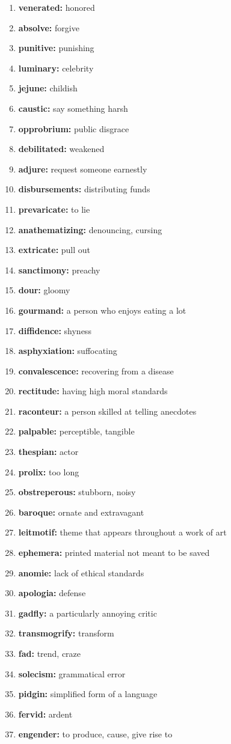 \documentclass{article}
\begin{document}
\begin{enumerate}
    \item \textbf{venerated: }{honored}
    \item \textbf{absolve: }{forgive}
    \item \textbf{punitive: }{punishing}
    \item \textbf{luminary: }{celebrity}
    \item \textbf{jejune: }{childish}
    \item \textbf{caustic: }{say something harsh}
    \item \textbf{opprobrium: }{public disgrace}
    \item \textbf{debilitated: }{weakened}
    \item \textbf{adjure: }{request someone earnestly}
    \item \textbf{disbursements: }{distributing funds}
    \item \textbf{prevaricate: }{to lie}
    \item \textbf{anathematizing: }{denouncing, cursing}
    \item \textbf{extricate: }{pull out}
    \item \textbf{sanctimony: }{preachy}
    \item \textbf{dour: }{gloomy}
    \item \textbf{gourmand: }{a person who enjoys eating a lot}
    \item \textbf{diffidence: }{shyness}
    \item \textbf{asphyxiation: }{suffocating}
    \item \textbf{convalescence: }{recovering from a disease}
    \item \textbf{rectitude: }{having high moral standards}
    \item \textbf{raconteur: }{a person skilled at telling anecdotes}
    \item \textbf{palpable: }{perceptible, tangible}
    \item \textbf{thespian: }{actor}
    \item \textbf{prolix: }{too long}
    \item \textbf{obstreperous: }{stubborn, noisy}
    \item \textbf{baroque: }{ornate and extravagant}
    \item \textbf{leitmotif: }{theme that appears throughout a work of art}
    \item \textbf{ephemera: }{printed material not meant to be saved}
    \item \textbf{anomie: }{lack of ethical standards}
    \item \textbf{apologia: }{defense}
    \item \textbf{gadfly: }{a particularly annoying critic}
    \item \textbf{transmogrify: }{transform}
    \item \textbf{fad: }{trend, craze}
    \item \textbf{solecism: }{grammatical error}
    \item \textbf{pidgin: }{simplified form of a language}
    \item \textbf{fervid: }{ardent}
    \item \textbf{engender: }{to produce, cause, give rise to}
    
\end{enumerate}
\end{document}
